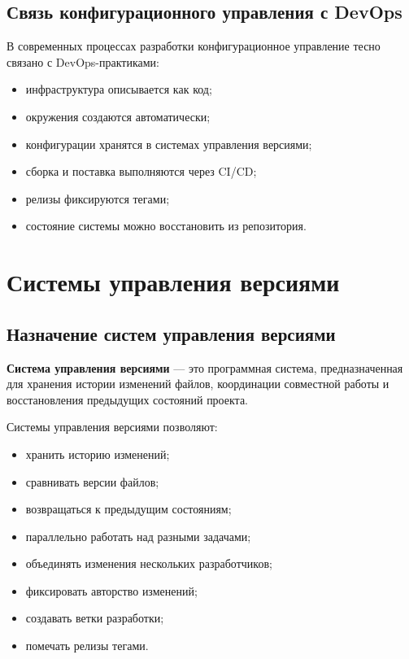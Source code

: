 \documentclass[12pt,a4paper]{article}
\begin{document}
\subsection{Связь конфигурационного управления с DevOps}

В современных процессах разработки конфигурационное управление тесно связано с DevOps-практиками:

\begin{itemize}
    \item инфраструктура описывается как код;
    \item окружения создаются автоматически;
    \item конфигурации хранятся в системах управления версиями;
    \item сборка и поставка выполняются через CI/CD;
    \item релизы фиксируются тегами;
    \item состояние системы можно восстановить из репозитория.
\end{itemize}

\section{Системы управления версиями}

\subsection{Назначение систем управления версиями}

\textbf{Система управления версиями} --- это программная система, предназначенная для хранения истории изменений файлов, координации совместной работы и восстановления предыдущих состояний проекта.

Системы управления версиями позволяют:

\begin{itemize}
    \item хранить историю изменений;
    \item сравнивать версии файлов;
    \item возвращаться к предыдущим состояниям;
    \item параллельно работать над разными задачами;
    \item объединять изменения нескольких разработчиков;
    \item фиксировать авторство изменений;
    \item создавать ветки разработки;
    \item помечать релизы тегами.
\end{itemize}
\end{document}
